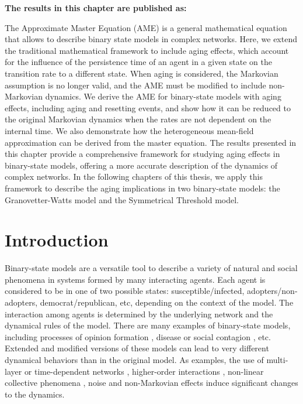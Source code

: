 \vspace{-1.5cm}
\small
\textbf{The results in this chapter are published as:}
\vspace{0.05 cm}

\normalsize
\vspace{0.5 cm}

The Approximate Master Equation (AME) is a general mathematical equation that allows to describe binary state models in complex networks. Here, we extend the traditional mathematical framework to include aging effects, which account for the influence of the persistence time of an agent in a given state on the transition rate to a different state. When aging is considered, the Markovian assumption is no longer valid, and the AME must be modified to include non-Markovian dynamics. We derive the AME for binary-state models with aging effects, including aging and resetting events, and show how it can be reduced to the original Markovian dynamics when the rates are not dependent on the internal time. We also demonstrate how the heterogeneous mean-field approximation can be derived from the master equation. The results presented in this chapter provide a comprehensive framework for studying aging effects in binary-state models, offering a more accurate description of the dynamics of complex networks. In the following chapters of this thesis, we apply this framework to describe the aging implications in two binary-state models: the Granovetter-Watts model and the Symmetrical Threshold model.

\section{\label{sec:Introduction_binary} Introduction}

Binary-state models are a versatile tool to describe a variety of natural and social phenomena in systems formed by many interacting agents. Each agent is considered to be in one of two possible states: susceptible/infected, adopters/non-adopters, democrat/republican, etc, depending on the context of the model. The interaction among agents is determined by the underlying network and the dynamical rules of the model. There are many examples of binary-state models, including processes of opinion formation \cite{Voter-original,sood-2005,fernandez-gracia-2014,redner-2019}, disease or social contagion \cite{granovetter-1978,pastor-satorras-2015}, etc. Extended and modified versions of these models can lead to very different dynamical behaviors than in the original model. As examples, the use of multi-layer  \cite{diakonova-2014,diakonova-2016,amato-2017} or time-dependent networks \cite{vazquez-2008}, higher-order interactions \cite{de-arruda-2020, iacopini-2019, cencetti-2021}, non-linear collective phenomena \cite{castellano-2009,peralta-2018}, noise \cite{carro-2016} and non-Markovian \cite{van-mieghem-2013,starnini-2017,peralta-2020A,chen-2020} effects induce significant changes to the dynamics.

